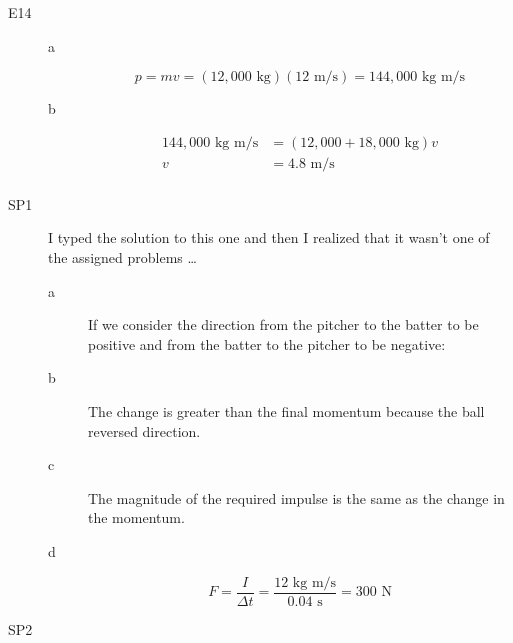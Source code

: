 \documentclass{exam}
\begin{document}
\begin{description}
\begin{description}
\end{description}

\item[E14]
\begin{description}
\item[a]
\[
  p = mv = (12,000 \text{ kg})(12 \text{ m/s}) = 144,000 \text{ kg m/s}
\]

\item[b]
\begin{align*}
  144,000 \text{ kg m/s} &= (12,000 + 18,000 \text{ kg}) v \\
  v &= 4.8 \text{ m/s} \\
\end{align*}

\end{description}

\item[SP1]

I typed the solution to this one and then I realized that it wasn't one of the assigned problems \ldots

\begin{description}
\item[a]
If we consider the direction from the pitcher to the batter to be positive and from the batter to the pitcher to be negative:

\item[b]
The change is greater than the final momentum because the ball reversed direction.

\item[c]
The magnitude of the required impulse is the same as the change in the momentum.

\item[d]
\[
  F = \frac{I}{\Delta t} = \frac{12 \text{ kg m/s}}{0.04 \text{ s}} = 300 \text{ N}
\]

\end{description}

\item[SP2]


\end{description}
\end{document}
